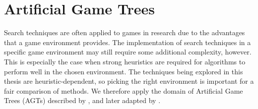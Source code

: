 %
%

\chapter{Artificial Game Trees}
\label{cht:ArtificialGameTrees}
Search techniques are often applied to games in research due to the advantages that a game environment provides. The implementation of search techniques in a specific game environment may still require some additional complexity, however. This is especially the case when strong heuristics are required for algorithms to perform well in the chosen environment. The techniques being explored in this thesis are heuristic-dependent, so picking the right environment is important for a fair comparison of methods. We therefore apply the domain of Artificial Game Trees (AGTs) described by , and later adapted by . 

